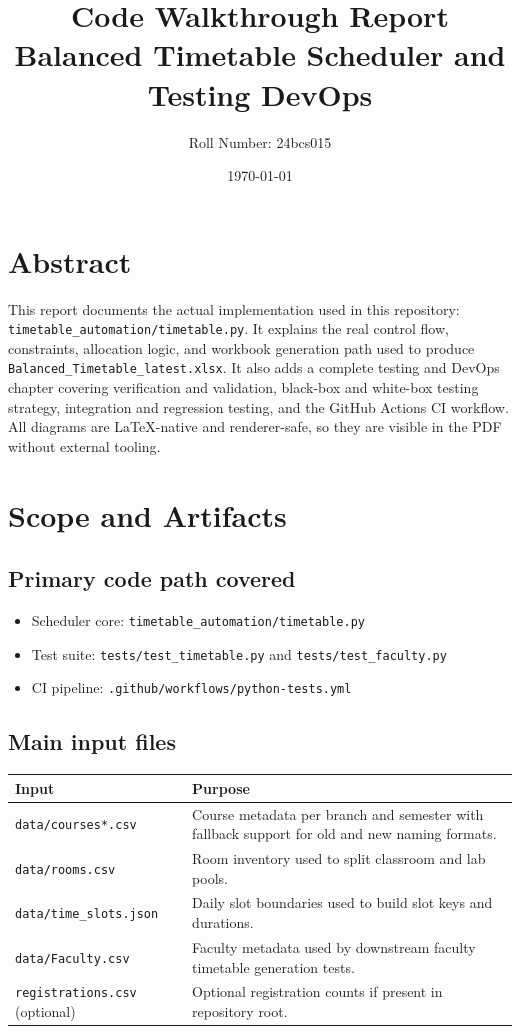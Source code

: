 \documentclass[12pt,a4paper]{article}
\title{Code Walkthrough Report\\\large Balanced Timetable Scheduler and Testing DevOps}
\author{Roll Number: 24bcs015}
\date{\today}
\begin{document}
\maketitle
\tableofcontents
\newpage

\section*{Abstract}
This report documents the actual implementation used in this repository: \texttt{timetable\_automation/timetable.py}. It explains the real control flow, constraints, allocation logic, and workbook generation path used to produce \texttt{Balanced\_Timetable\_latest.xlsx}. It also adds a complete testing and DevOps chapter covering verification and validation, black-box and white-box testing strategy, integration and regression testing, and the GitHub Actions CI workflow. All diagrams are LaTeX-native and renderer-safe, so they are visible in the PDF without external tooling.

\section{Scope and Artifacts}

\subsection{Primary code path covered}
\begin{itemize}[leftmargin=1.2cm]
  \item Scheduler core: \texttt{timetable\_automation/timetable.py}
  \item Test suite: \texttt{tests/test\_timetable.py} and \texttt{tests/test\_faculty.py}
  \item CI pipeline: \texttt{.github/workflows/python-tests.yml}
\end{itemize}

\subsection{Main input files}
\begin{longtable}{p{}p{}}
\toprule
\textbf{Input} & \textbf{Purpose} \\
\midrule
\endhead
\texttt{data/courses*.csv} & Course metadata per branch and semester with fallback support for old and new naming formats. \\
\texttt{data/rooms.csv} & Room inventory used to split classroom and lab pools. \\
\texttt{data/time\_slots.json} & Daily slot boundaries used to build slot keys and durations. \\
\texttt{data/Faculty.csv} & Faculty metadata used by downstream faculty timetable generation tests. \\
\texttt{registrations.csv} (optional) & Optional registration counts if present in repository root. \\
\bottomrule
\end{longtable}
\end{document}
